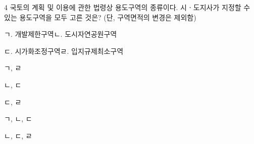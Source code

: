 \begin{question}{4}
국토의 계획 및 이용에 관한 법령상 용도구역의 종류이다. 시ㆍ도지사가 지정할 수 있는 용도구역을 모두 고른 것은? (단, 구역면적의 변경은 제외함)
\begin{framedtext}
ㄱ. 개발제한구역\quad ㄴ. 도시자연공원구역 \par
ㄷ. 시가화조정구역\quad ㄹ. 입지규제최소구역 \par
\end{framedtext}
\begin{choices}
  \item ㄱ, ㄹ
  \item ㄴ, ㄷ
  \item ㄷ, ㄹ
  \item ㄱ, ㄴ, ㄷ
  \item ㄴ, ㄷ, ㄹ
\end{choices}
\end{question}

